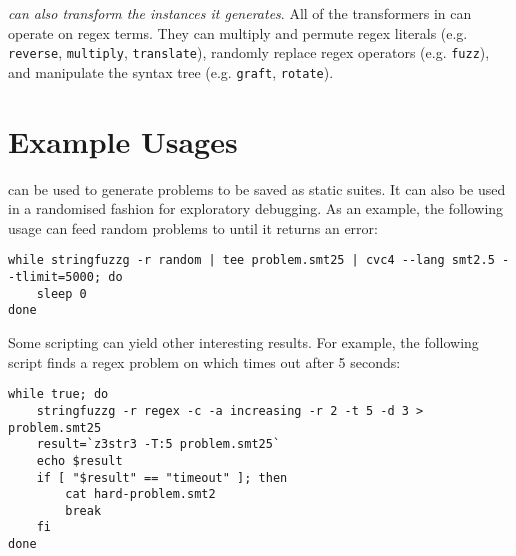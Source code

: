         {\it \fuzzer{} can also transform the instances it generates}. All of the transformers in \transformer{} can operate on regex terms. They can multiply and permute regex literals (e.g. \texttt{reverse}, \texttt{multiply}, \texttt{translate}), randomly replace regex operators (e.g. \texttt{fuzz}), and manipulate the syntax tree (e.g. \texttt{graft}, \texttt{rotate}).

        
\section{Example Usages}
\vspace{-0.1in}

        \fuzzer{} can be used to generate problems to be saved as static suites. It can also be used in a randomised fashion for exploratory debugging. As an example, the following usage can feed random problems to \cvc{} until it returns an error:
\begin{center}
\vspace{-0.05in}
\begin{varwidth}{\linewidth}
{\scriptsize\begin{verbatim}while stringfuzzg -r random | tee problem.smt25 | cvc4 --lang smt2.5 --tlimit=5000; do
    sleep 0
done
\end{verbatim}}
\end{varwidth}
\end{center}
        Some \unix{} scripting can yield other interesting results. For example, the following script finds a regex problem on which \us{} times out after 5 seconds:
\begin{center}
\vspace{-0.1in}
\begin{varwidth}{\linewidth}
        {\scriptsize\begin{verbatim}while true; do
    stringfuzzg -r regex -c -a increasing -r 2 -t 5 -d 3 > problem.smt25
    result=`z3str3 -T:5 problem.smt25`
    echo $result
    if [ "$result" == "timeout" ]; then
        cat hard-problem.smt2
        break
    fi
done\end{verbatim}}
\end{varwidth}
\end{center}
